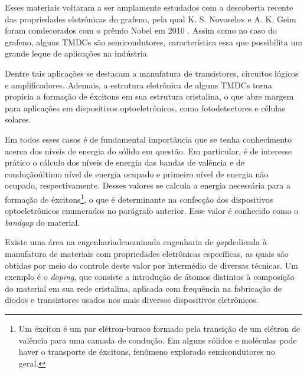 

Esses materiais voltaram a ser amplamente estudados com a descoberta recente das
propriedades eletrônicas do grafeno, pela qual K. S. Novoselov e A. K. Geim foram
condecorados com o prêmio Nobel em 2010 \cite{kolobov2016tmdc}. Assim como no caso do grafeno, alguns
TMDCs são semicondutores, característica essa que possibilita um grande leque de
aplicações na indústria. 

Dentre tais aplicações se destacam a manufatura de transistores, circuitos
lógicos e amplificadores. Ademais, a estrutura eletrônica de alguns TMDCs torna
propícia a formação de éxcitons em sua estrutura cristalina, o que abre margem
para aplicações em dispositivos optoeletrônicos, como fotodetectores e células
solares.

Em todos esses casos é de fundamental importância que se tenha conhecimento
acerca dos níveis de energia do sólido em questão. Em particular, é de interesse
prático o cálculo dos níveis de energia das bandas de valência e de
condução\trav último nível de energia ocupado e primeiro nível de energia não
ocupado, respectivamente. Desses valores se calcula a energia necessária para a
formação de éxcitons\footnote{
  Um éxciton é um par elétron-buraco formado pela transição de um elétron de
  valência para uma camada de condução. Em alguns sólidos e moléculas pode haver o
  transporte de éxcitons, fenômeno explorado semicondutores no geral. 
}, o que é determinante na confecção dos dispositivos optoeletrônicos enumerados
no parágrafo anterior. Esse valor é conhecido como o \textit{bandgap} do material.

Existe uma área na engenharia\trav denominada engenharia de
\textit{gap}\trav dedicada à manufatura de materiais com propriedades
eletrônicas específicas, as quais são obtidas por meio do controle deste valor
por intermédio de diversas técnicas. Um exemplo é o \textit{doping}, que
consiste a introdução de átomos distintos à composição do material em sua rede
cristalina, aplicada com frequência na fabricação de diodos e transistores
usados nos mais diversos dispositivos eletrônicos.


